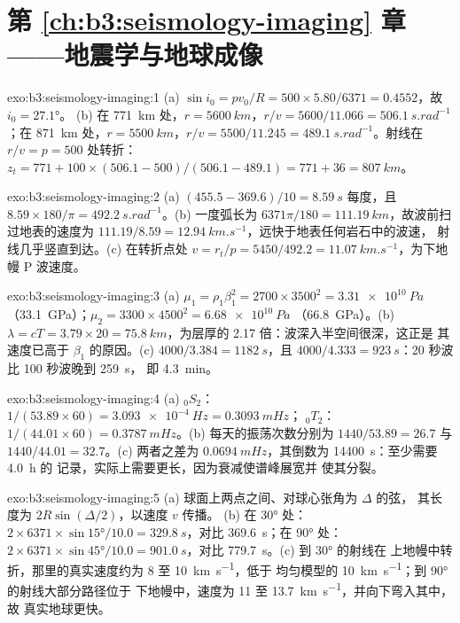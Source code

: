 \section*{第 \ref{ch:b3:seismology-imaging} 章——地震学与地球成像}

\begin{solution}{exo:b3:seismology-imaging:1}
(a) $\sin i_0 = pv_0/R = 500\times5.80/6371 = 0.4552$，故 $i_0 = \ang{27.1}$。
(b) 在 \qty{771}{km} 处，$r = \qty{5600}{km}$，$r/v = 5600/11.066 =
\qty{506.1}{s.rad^{-1}}$；在 \qty{871}{km} 处，$r = \qty{5500}{km}$，$r/v =
5500/11.245 = \qty{489.1}{s.rad^{-1}}$。射线在 $r/v = p = 500$ 处转折：
$z_t = 771 + 100\times(506.1 - 500)/(506.1 - 489.1) = 771 + 36 =
\qty{807}{km}$。
\end{solution}

\begin{solution}{exo:b3:seismology-imaging:2}
(a) $(455.5 - 369.6)/10 = \qty{8.59}{s}$ 每度，且
$8.59\times180/\pi = \qty{492.2}{s.rad^{-1}}$。(b) 一度弧长为
$6371\pi/180 = \qty{111.19}{km}$，故波前扫过地表的速度为
$111.19/8.59 = \qty{12.94}{km.s^{-1}}$，远快于地表任何岩石中的波速，
射线几乎竖直到达。(c) 在转折点处 $v = r_t/p =
5450/492.2 = \qty{11.07}{km.s^{-1}}$，为下地幔 P 波速度。
\end{solution}

\begin{solution}{exo:b3:seismology-imaging:3}
(a) $\mu_1 = \rho_1\beta_1^2 = 2700\times3500^2 = \qty{3.31e10}{Pa}$
（\qty{33.1}{GPa}）；$\mu_2 = 3300\times4500^2 = \qty{6.68e10}{Pa}$
（\qty{66.8}{GPa}）。(b) $\lambda = cT = 3.79\times20 = \qty{75.8}{km}$，为层厚的 2.17
倍：波深入半空间很深，这正是
其速度已高于 $\beta_1$ 的原因。(c) $4000/3.384 = \qty{1182}{s}$，且
$4000/4.333 = \qty{923}{s}$：20 秒波比 100 秒波晚到 \qty{259}{s}，
即 \qty{4.3}{min}。
\end{solution}

\begin{solution}{exo:b3:seismology-imaging:4}
(a) ${}_0S_2$：$1/(53.89\times60) = \qty{3.093e-4}{Hz} = \qty{0.3093}{mHz}$；
${}_0T_2$：$1/(44.01\times60) = \qty{0.3787}{mHz}$。(b) 每天的振荡次数分别为 $1440/53.89 = 26.7$
与 $1440/44.01 = 32.7$。(c) 两者之差为
$\qty{0.0694}{mHz}$，其倒数为 \qty{14400}{s}：至少需要 \qty{4.0}{h} 的
记录，实际上需要更长，因为衰减使谱峰展宽并
使其分裂。
\end{solution}

\begin{solution}{exo:b3:seismology-imaging:5}
(a) 球面上两点之间、对球心张角为 $\Delta$ 的弦，
其长度为 $2R\sin(\Delta/2)$，以速度 $v$ 传播。
(b) 在 \ang{30} 处：$2\times6371\times\sin\ang{15}/10.0 = \qty{329.8}{s}$，对比
\qty{369.6}{s}；在 \ang{90} 处：$2\times6371\times\sin\ang{45}/10.0 =
\qty{901.0}{s}$，对比 \qty{779.7}{s}。(c) 到 \ang{30} 的射线在
上地幔中转折，那里的真实速度约为 8 至 \qty{10}{km.s^{-1}}，低于
均匀模型的 \qty{10}{km.s^{-1}}；到 \ang{90} 的射线大部分路径位于
下地幔中，速度为 11 至 \qty{13.7}{km.s^{-1}}，并向下弯入其中，故
真实地球更快。
\end{solution}

